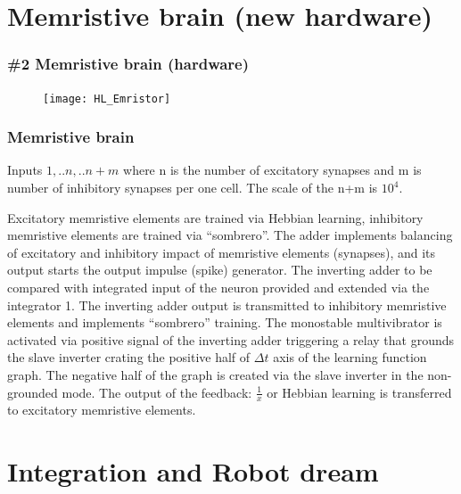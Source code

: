 \documentclass[12pt, aspectratio=169]{beamer}
\begin{document}
\section{Memristive brain (new hardware)}

\begin{frame}
\frametitle{\#2 Memristive brain (hardware)}
\begin{figure}
\texttt{[image: HL\_Emristor]}
\end{figure}
\end{frame}


\begin{frame}
\frametitle{Memristive brain}
  
Inputs $1, ..n, ..n + m$ where n is the number of excitatory synapses and m is number of inhibitory synapses per one cell. The scale of the n+m is $10^4$.

Excitatory memristive elements are trained via Hebbian learning, inhibitory memristive elements are trained via ``sombrero''. The adder implements balancing of excitatory and inhibitory impact of memristive elements (synapses), and its output starts the output impulse (spike) generator. The inverting adder to be compared with integrated input of the neuron provided and extended via the integrator 1. The inverting adder output is transmitted to inhibitory memristive elements and implements ``sombrero'' training. The monostable multivibrator is activated via positive signal of the inverting adder triggering a relay that grounds the slave inverter crating the positive half of $\Delta t$ axis of the learning function graph. The negative half of the graph is created via the slave inverter in the non-grounded mode. The output of the feedback: $\frac{1}{x}$ or Hebbian learning is transferred to excitatory memristive elements.
  
\end{frame}

\section{Integration and Robot dream}
\end{document}
